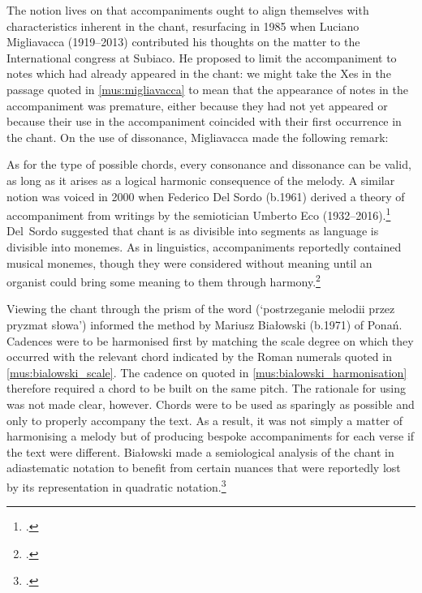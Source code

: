 The notion lives on that accompaniments ought to align themselves with characteristics inherent in the chant, resurfacing in 1985 when Luciano Migliavacca (1919--2013) contributed his thoughts on the matter to the International congress at Subiaco.
He proposed to limit the accompaniment to notes which had already appeared in the chant: we might take the Xes in the passage quoted in \cref{mus:migliavacca} to mean that the appearance of notes in the accompaniment was premature, either because they had not yet appeared or because their use in the accompaniment coincided with their first occurrence in the chant.
On the use of dissonance, Migliavacca made the following remark:

  {\cite[133, 137]{MigliavaccaArmonizzazionemodaleCanto1985}}
{As for the type of possible chords, every consonance and dissonance can be valid, as long as it arises as a logical harmonic consequence of the melody.}
\noindent
A similar notion was voiced in 2000 when Federico Del Sordo (b.1961) derived a theory of accompaniment from writings by the semiotician Umberto Eco (1932--2016).\footnote{\cite[43]{Ecostrutturaassentericerca1968}.}
Del~Sordo suggested that chant is as divisible into segments as language is divisible into monemes.
As in linguistics, accompaniments reportedly contained musical monemes, though they were considered without meaning until an organist could bring some meaning to them through harmony.\footcite[53]{DelSordomonemicanellaccompagnamento2000}

Viewing the chant through the prism of the word (`postrzeganie melodii przez pryzmat słowa') informed the method by Mariusz Białowski (b.1971) of Ponań.
Cadences were to be harmonised first by matching the scale degree on which they occurred with the relevant chord indicated by the Roman numerals quoted in \cref{mus:bialowski_scale}.
The cadence on \kern 1pt\flat{} quoted in \cref{mus:bialowski_harmonisation} therefore required a chord to be built on the same pitch.
The rationale for using  was not made clear, however.
Chords were to be used as sparingly as possible and only to properly accompany the text.
As a result, it was not simply a matter of harmonising a melody but of producing bespoke accompaniments for each verse if the text were different.
Białowski made a semiological analysis of the chant in adiastematic notation to benefit from certain nuances that were reportedly lost by its representation in quadratic notation.\footcite[20, 24--9]{BialkowskiAnalizasemiologicznomodalnaswietle2012}

